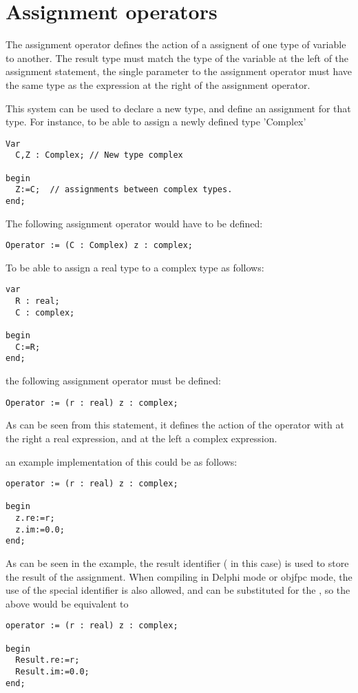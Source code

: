 \section{Assignment operators}

The assignment operator defines the action of a assignent of one type of
variable to another. The result type must match the type of the variable
at the left of the assignment statement, the single parameter to the
assignment operator must have the same type as the expression at the
right of the assignment operator.

This system can be used to declare a new type, and define an assignment for
that type. For instance, to be able to assign a newly defined type 'Complex'
\begin{verbatim}
Var
  C,Z : Complex; // New type complex

begin
  Z:=C;  // assignments between complex types.
end;
\end{verbatim}
The following assignment operator would have to be defined:
\begin{verbatim}
Operator := (C : Complex) z : complex;
\end{verbatim}


To be able to assign a real type to a complex type as follows:
\begin{verbatim}
var
  R : real;
  C : complex;

begin
  C:=R;
end;
\end{verbatim}
the following assignment operator must be defined:
\begin{verbatim}
Operator := (r : real) z : complex;
\end{verbatim}
As can be seen from this statement, it defines the action of the operator
\var{:=} with at the right a real expression, and at the left a complex
expression.

an example implementation of this could be as follows:
\begin{verbatim}
operator := (r : real) z : complex;

begin
  z.re:=r;
  z.im:=0.0;
end;
\end{verbatim}
As can be seen in the example, the result identifier ( in this case)
is used to store the result of the assignment. When compiling in Delphi mode
or objfpc mode, the use of the special identifier  is also
allowed, and can be substituted for the , so the above would be
equivalent to
\begin{verbatim}
operator := (r : real) z : complex;

begin
  Result.re:=r;
  Result.im:=0.0;
end;
\end{verbatim}

